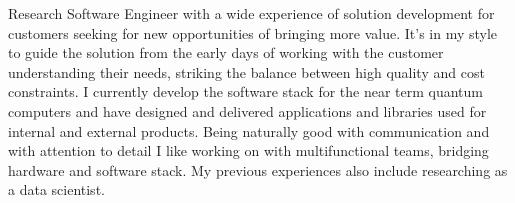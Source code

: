 \documentclass[10pt,a4paper,ragged2e,withhyper]{altacv}
\begin{document}


\makecvheader

Research Software Engineer with a wide experience of solution development for customers
seeking for new opportunities of bringing more value.
It's in my style to guide the solution from the early days of working with the customer
understanding their needs, striking the balance between high quality and cost constraints.
I currently develop the software stack for the near term quantum computers and have designed
and delivered applications and libraries used for internal and external products.
Being naturally good with communication and with attention to detail I like working on
with multifunctional teams, bridging hardware and software stack.
My previous experiences also include researching as a data scientist.

\end{document}
